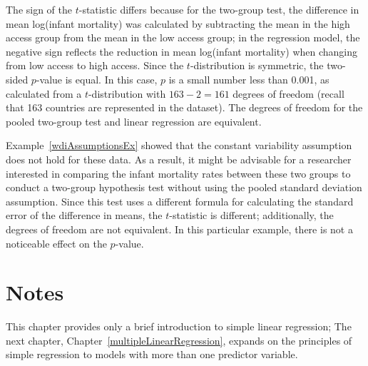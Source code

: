 

The sign of the $t$-statistic differs because for the two-group test, the difference in mean log(infant mortality) was calculated by subtracting the mean in the high access group from the mean in the low access group; in the regression model, the negative sign reflects the reduction in mean log(infant mortality) when changing from low access to high access. Since the $t$-distribution is symmetric, the two-sided $p$-value is equal. In this case, $p$ is a small number less than 0.001, as calculated from a $t$-distribution with $163-2 = 161$ degrees of freedom (recall that 163 countries are represented in the dataset). The degrees of freedom for the pooled two-group test and linear regression are equivalent.

Example~\ref{wdiAssumptionsEx} showed that the constant variability assumption does not hold for these data. As a result, it might be advisable for a researcher interested in comparing the infant mortality rates between these two groups to conduct a two-group hypothesis test without using the pooled standard deviation assumption. Since this test uses a different formula for calculating the standard error of the difference in means, the $t$-statistic is different; additionally, the degrees of freedom are not equivalent. In this particular example, there is not a noticeable effect on the $p$-value.



\newpage

\section{Notes}

This chapter provides only a brief introduction to simple linear regression; The next chapter, Chapter~\ref{multipleLinearRegression}, expands on the principles of simple regression to models with more than one predictor variable. 

